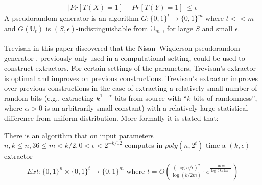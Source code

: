 \begin{align*}
	|Pr[T(X) = 1] - Pr[T(Y) = 1]| \leq \epsilon
\end{align*}
A pseudorandom generator is an algorithm $G : \{0, 1\}^t \rightarrow \{0, 1\}^m$ where $t << m$ and $G(\mathbb{U}_t)$ is $(S, \epsilon)$-indistinguishable from $\mathbb{U}_m$ , for large $S$ and small $\epsilon$.
\\~\\
Trevisan in this paper discovered that the Nisan–Wigderson pseudorandom generator \cite{Nisan:1994:HVR:192095.192097}, previously only used in a computational setting, could be used to construct extractors. For certain settings of the parameters, Trevisan’s extractor is optimal and improves on previous constructions. Trevisan’s extractor improves over previous constructions in the case of extracting a relatively small number of random bits (e.g., extracting $k^{1-\alpha}$ bits from source with “$k$ bits of randomness”, where $\alpha > 0$ is an arbitrarily small constant) with a relatively large statistical difference from uniform distribution. More formally it is stated that:
\begin{theorem}
	There is an algorithm that on input parameters $n, k \leq n, 36 \leq m < k/2, 0 < \epsilon < 2^{-k/12}$ computes in $poly(n, 2^t)$ time a $(k,\epsilon)$-extractor
	\begin{align*}
		Ext:\{0,1\}^n \times \{0,1\}^t \rightarrow \{0,1\}^m \text{ where } t = O(\frac{{(\log n/\epsilon)}^2}{\log(k/2m)} \cdot e^{\frac{\ln m}{\log (k/2m)}})
	\end{align*}
\end{theorem}
